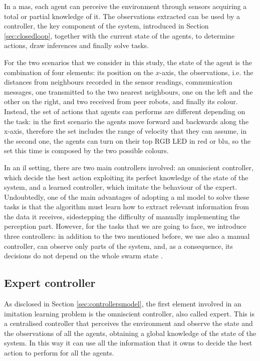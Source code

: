 
In a \gls{mas}, each agent can perceive the environment through sensors 
acquiring a total or partial knowledge of it. The observations extracted can be 
used by a controller, the key component of the system, introduced in Section 
\ref{sec:closedloop}, together with the current state of the agents, to determine 
actions, draw inferences and finally solve tasks. 

For the two scenarios that we consider in this study, the state of the agent is the 
combination of four elements: its position on the $x$-axis, the observations, i.e. 
the distances from neighbours recorded in the sensor readings, communication 
messages, one transmitted to the two nearest neighbours, one on the left and the 
other on the right, and two received from peer robots, and finally its colour.
Instead, the set of actions that agents can performs are different depending on 
the task: in the first scenario the agents move forward and backwards along the 
x-axis, therefore the set includes the range of velocity that they can assume, in the 
second one, the agents  can turn on their top RGB LED in red or blu, so the set this 
time is composed by the two possible colours.

In an \gls{il} setting, there are two main controllers involved: an omniscient 
controller, which decide the best action exploiting its perfect knowledge of the 
state of the system, and a learned controller, which imitate the behaviour of the 
expert.
Undoubtedly, one of the main advantages of adopting a \gls{ml} model to solve 
these tasks is that the algorithm must learn how to extract relevant information 
from the data it receives, sidestepping the difficulty of manually implementing the 
perception part.
However, for the tasks that we are going to face, we introduce three controllers: in 
addition to the two mentioned before, we use also a manual controller, can 
observe only parts of the system, and, as a consequence, its decisions do not 
depend on the whole swarm state \cite[][]{vsovsic2016inverse}.

\subsection{Expert controller}
\label{subsec:expert}

As disclosed in Section \ref{sec:controllersmodel}, the first element involved in an 
imitation learning problem is the omniscient controller, also called expert. 
This is a centralised controller that perceives the environment and observe the 
state and the observations of all the agents, obtaining a global knowledge of the 
state of the system. In this way it can use all the information that it owns to decide 
the best action to perform for all the agents. 

